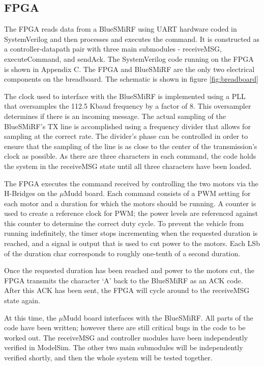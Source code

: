 \documentclass[11pt]{article}
\begin{document}
\subsection{FPGA}
The FPGA reads data from a BlueSMiRF using UART hardware coded in SystemVerilog and then processes and executes the command.  It is constructed as a controller-datapath pair with three main submodules - receiveMSG, executeCommand, and sendAck.  The SystemVerilog code running on the FPGA is shown in Appendix C. The FPGA and BlueSMiRF are the only two electrical components on the breadboard. The schematic is shown in figure \ref{fig:breadboard}

The clock used to interface with the BlueSMiRF is implemented using a PLL that oversamples the 112.5 Kbaud frequency by a factor of 8.  This oversampler determines if there is an incoming message.  The actual sampling of the BlueSMiRF's TX line is accomplished using a frequency divider that allows for sampling at the correct rate.  The divider's phase can be controlled in order to ensure that the sampling of the line is as close to the center of the transmission's clock as possible.  As there are three characters in each command, the code holds the system in the receiveMSG state until all three characters have been loaded.

The FPGA executes the command received by controlling the two motors via the H-Bridges on the $\mu$Mudd board. Each command consists of a PWM setting for each motor and a duration for which the motors should be running.  A counter is used to create a reference clock for PWM; the power levels are referenced against this counter to determine the correct duty cycle.  To prevent the vehicle from running indefinitely, the timer stops incrementing when the requested duration is reached, and a signal is output that is used to cut power to the motors.  Each LSb of the duration char corresponds to roughly one-tenth of a second duration.

Once the requested duration has been reached and power to the motors cut, the FPGA transmits the character `A' back to the BlueSMiRF as an ACK code.  After this ACK has been sent, the FPGA will cycle around to the receiveMSG state again.

At this time, the $\mu$Mudd board interfaces with the BlueSMiRF.  All parts of the code have been written; however there are still critical bugs in the code to be worked out.  The receiveMSG and controller modules have been independently verified in ModelSim.  The other two main submodules will be independently verified shortly, and then the whole system will be tested together.
\end{document}
